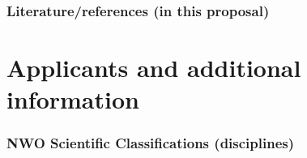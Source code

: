 \documentclass[a4paper,10pt,fleqn]{application}
\begin{document}
\newpage
\section{Literature/references (in this proposal)}




%
%



\part{Applicants and additional information}

\section{NWO Scientific Classifications (disciplines)}
\end{document}
